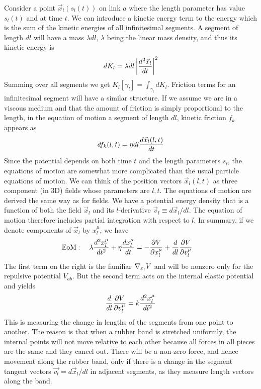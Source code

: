 \documentclass[nofootinbib,preprint,floatfix,titlepage,endfloats,superscriptaddress]{revtex4} %
\begin{document}
Consider a point $\vec{x}_l(s_l(t))$ on link $a$ where the length parameter has value $s_l(t)$ and at time $t$. We can introduce a kinetic energy term to the energy which is the sum of the kinetic energies of all infinitesimal segments.
A segment of length $dl$ will have a mass $\lambda dl $, $\lambda$ being the linear mass density, and thus its kinetic energy is
\[dK_l = \lambda dl \left|d^2 \vec{x}_l \over dt \right|^2\]
Summing over all segments we get $K_l[\gamma_l] = \int_{\gamma_l} dK_l$. Friction terms for an infinitesimal segment will have a similar structure. If we assume we are in a viscous medium and that the amount of friction is simply proportional to the length, in the equation of motion a segment of length $dl$, kinetic friction $f_k$ appears as 
\[df_k(l,t) =\eta dl {d\vec{x}_l(l,t)\over dt}\] 
Since the potential depends on both time $t$ and the length parameters $s_l$, the equations of motion are somewhat more complicated than the usual particle equations of motion. We can think of the position vectors $\vec{x}_l (l,t)$ as three component (in 3D) fields whose parameters are $l,t$. The equations of motion are derived the same way as for fields. We have a potential energy density that is a function of both the field $\vec{x}_l$ and its $l$-derivative $\vec{v}_l \equiv d\vec{x}_l/dl$. The equation of motion therefore includes partial integration with respect to $l$. In summary, if we denote components of $\vec{x}_l$ by $x_l^\mu$, we have 
\begin{align}
    \mbox{EoM}:\quad \lambda {d^2 x_l^\mu \over dt^2} +\eta {dx_l^\mu \over dt} & =  -{\partial V \over \partial x_l^\mu} + {d\over dl} {\partial V \over \partial v_l^\mu}   \label{eq:Langevin}
\end{align}
The first term on the right is the familiar $\nabla_{x_l} V$ and will be nonzero only for the repulsive potential $V_{ab}$. But the second term acts on the internal elastic potential and yields \[{d\over dl} {\partial V \over \partial v_l^\mu} = k {d^2 x_l^\mu \over dl^2}\]  
This is measuring the change in lengths of the segments from one point to another. The reason is that when a rubber band is stretched uniformly, the internal points will not move relative to each other because all forces in all pieces are the same and they cancel out. There will be a non-zero force, and hence movement along the rubber band, only if there is a change in the segment tangent vectors $\vec{v_l} = d\vec{x}_l/dl$ in adjacent segments, as they measure length vectors along the band.
\end{document}
